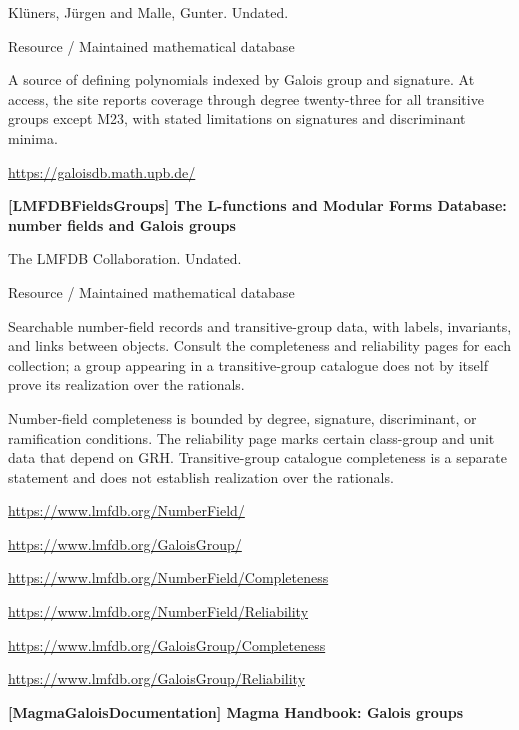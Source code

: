 \documentclass[11pt,a4paper,oneside,openany]{book}
\begin{document}
\color{black} Klüners, Jürgen and Malle, Gunter. Undated.\par
{\small\sffamily\color{atlasgold}Resource / Maintained mathematical database}\par
\color{black} A source of defining polynomials indexed by Galois group and signature. At access, the site reports coverage through degree twenty-three for all transitive groups except M23, with stated limitations on signatures and discriminant minima.\par
{\footnotesize\url{https://galoisdb.math.upb.de/}}\par
\vspace{9pt}
\hypertarget{ref:LMFDBFieldsGroups}{}
{\sffamily\bfseries\color{atlasgreen}[LMFDBFieldsGroups] The L-functions and Modular Forms Database: number fields and Galois groups}\par
\color{black} The LMFDB Collaboration. Undated.\par
{\small\sffamily\color{atlasgold}Resource / Maintained mathematical database}\par
\color{black} Searchable number-field records and transitive-group data, with labels, invariants, and links between objects. Consult the completeness and reliability pages for each collection; a group appearing in a transitive-group catalogue does not by itself prove its realization over the rationals.\par
{\small Number-field completeness is bounded by degree, signature, discriminant, or ramification conditions. The reliability page marks certain class-group and unit data that depend on GRH. Transitive-group catalogue completeness is a separate statement and does not establish realization over the rationals.}\par
{\footnotesize\url{https://www.lmfdb.org/NumberField/}}\par
{\footnotesize\url{https://www.lmfdb.org/GaloisGroup/}}\par
{\footnotesize\url{https://www.lmfdb.org/NumberField/Completeness}}\par
{\footnotesize\url{https://www.lmfdb.org/NumberField/Reliability}}\par
{\footnotesize\url{https://www.lmfdb.org/GaloisGroup/Completeness}}\par
{\footnotesize\url{https://www.lmfdb.org/GaloisGroup/Reliability}}\par
\vspace{9pt}
\hypertarget{ref:MagmaGaloisDocumentation}{}
{\sffamily\bfseries\color{atlasgreen}[MagmaGaloisDocumentation] Magma Handbook: Galois groups}\par
\end{document}

